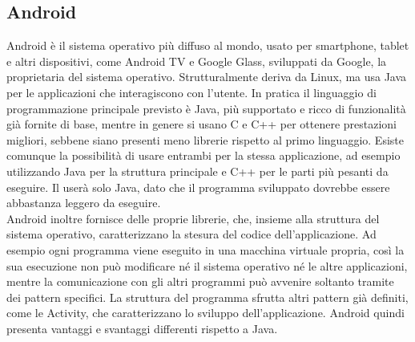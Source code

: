 \subsection{Android}

	Android è il sistema operativo più diffuso al mondo, usato per smartphone, tablet e altri dispositivi, come Android TV e Google Glass, sviluppati da Google, la proprietaria del sistema operativo. Strutturalmente deriva da Linux, ma usa Java per le applicazioni che interagiscono con l'utente. In pratica il linguaggio di programmazione principale previsto è Java, più supportato e ricco di funzionalità già fornite di base, mentre in genere si usano C e C++ per ottenere prestazioni migliori, sebbene siano presenti meno librerie rispetto al primo linguaggio. Esiste comunque la possibilità di usare entrambi per la stessa applicazione, ad esempio utilizzando Java per la struttura principale e C++ per le parti più pesanti da eseguire. Il  userà solo Java, dato che il programma sviluppato dovrebbe essere abbastanza leggero da eseguire. \\
	Android inoltre fornisce delle proprie librerie, che, insieme alla struttura del sistema operativo, caratterizzano la stesura del codice dell'applicazione. Ad esempio ogni programma viene eseguito in una macchina virtuale propria, così la sua esecuzione non può modificare né il sistema operativo né le altre applicazioni, mentre la comunicazione con gli altri programmi può avvenire soltanto tramite dei pattern specifici. La struttura del programma sfrutta altri pattern già definiti, come le Activity, che caratterizzano lo sviluppo dell'applicazione. Android quindi presenta vantaggi e svantaggi differenti rispetto a Java.

